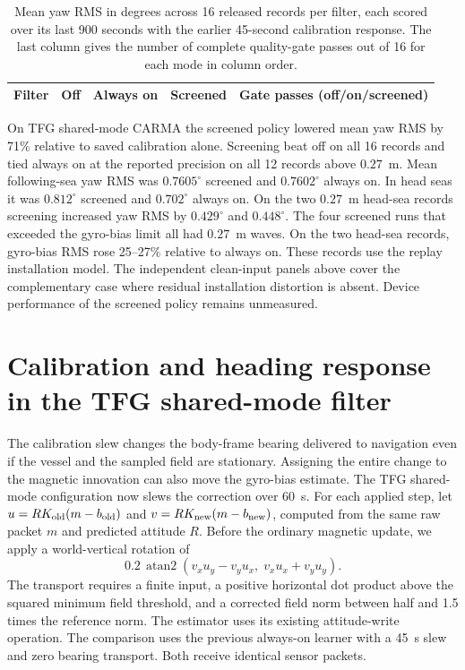 \documentclass[conference]{IEEEtran}
\begin{document}
\begin{table}[t]\centering\small
\caption{Mean yaw RMS in degrees across 16 released records per filter, each scored over its last 900 seconds with the earlier 45-second calibration response. The last column gives the number of complete quality-gate passes out of 16 for each mode in column order.}
\begin{tabular}{lrrrr}\toprule
Filter & Off & Always on & Screened & Gate passes (off/on/screened)\\\midrule
\end{tabular}\end{table}

On TFG shared-mode CARMA the screened policy lowered mean yaw RMS by 71\% relative to saved calibration alone. Screening beat off on all 16 records and tied always on at the reported precision on all 12 records above $0.27$~m. Mean following-sea yaw RMS was $0.7605^\circ$ screened and $0.7602^\circ$ always on. In head seas it was $0.812^\circ$ screened and $0.702^\circ$ always on. On the two $0.27$~m head-sea records screening increased yaw RMS by $0.429^\circ$ and $0.448^\circ$. The four screened runs that exceeded the gyro-bias limit all had $0.27$~m waves. On the two head-sea records, gyro-bias RMS rose 25--27\% relative to always on. These records use the replay installation model. The independent clean-input panels above cover the complementary case where residual installation distortion is absent. Device performance of the screened policy remains unmeasured.

\section{Calibration and heading response in the TFG shared-mode filter}
The calibration slew changes the body-frame bearing delivered to navigation even if the vessel and the sampled field are stationary. Assigning the entire change to the magnetic innovation can also move the gyro-bias estimate. The TFG shared-mode configuration now slews the correction over 60~s. For each applied step, let $u=R K_{\rm old}(m-b_{\rm old})$ and $v=R K_{\rm new}(m-b_{\rm new})$, computed from the same raw packet $m$ and predicted attitude $R$. Before the ordinary magnetic update, we apply a world-vertical rotation of
\[
  0.2\,\operatorname{atan2}(v_xu_y-v_yu_x,\;v_xu_x+v_yu_y).
\]
The transport requires a finite input, a positive horizontal dot product above the squared minimum field threshold, and a corrected field norm between half and 1.5 times the reference norm. The estimator uses its existing attitude-write operation. The comparison uses the previous always-on learner with a 45~s slew and zero bearing transport. Both receive identical sensor packets.
\end{document}
